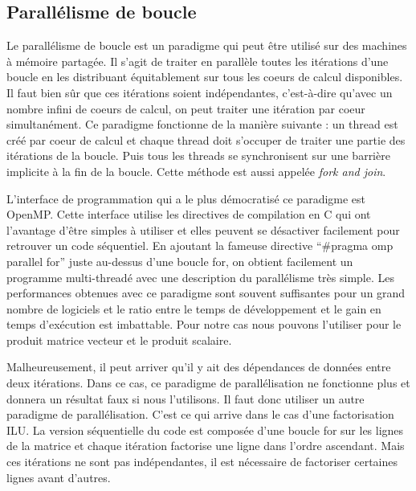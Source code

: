 \subsection{Parallélisme de boucle}
Le parallélisme de boucle est un paradigme qui peut être utilisé sur des machines à mémoire partagée.
%
Il s'agit de traiter en parallèle toutes les itérations d'une boucle en les distribuant équitablement sur tous les coeurs de calcul disponibles.
%
Il faut bien sûr que ces itérations soient indépendantes, c'est-à-dire qu'avec un nombre infini de coeurs de calcul, on peut traiter une itération par coeur simultanément.
%
Ce paradigme fonctionne de la manière suivante : un thread est créé par coeur de calcul et chaque thread doit s'occuper de traiter une partie des itérations de la boucle.
%
Puis tous les threads se synchronisent sur une barrière implicite à la fin de la boucle.
%
Cette méthode est aussi appelée {\em fork and join}.

L'interface de programmation qui a le plus démocratisé ce paradigme est OpenMP.
%
Cette interface utilise les directives de compilation en C qui ont l'avantage d'être simples à utiliser et elles peuvent se désactiver facilement pour retrouver un code séquentiel.
%
En ajoutant la fameuse directive ``\#pragma omp parallel for'' juste au-dessus d'une boucle for, on obtient facilement un programme multi-threadé avec une description du parallélisme très simple.
%
Les performances obtenues avec ce paradigme sont souvent suffisantes pour un grand nombre de logiciels et le ratio entre le temps de développement et le gain en temps d'exécution est imbattable.
%
Pour notre cas nous pouvons l'utiliser pour le produit matrice vecteur et le produit scalaire.

Malheureusement, il peut arriver qu'il y ait des dépendances de données entre deux itérations.
%
Dans ce cas, ce paradigme de parallélisation ne fonctionne plus et donnera un résultat faux si nous l'utilisons.
%
Il faut donc utiliser un autre paradigme de parallélisation.
%
C'est ce qui arrive dans le cas d'une factorisation ILU.
%
La version séquentielle du code est composée d'une boucle for sur les lignes de la matrice et chaque itération factorise une ligne dans l'ordre ascendant.
%
Mais ces itérations ne sont pas indépendantes, il est nécessaire de factoriser certaines lignes avant d'autres.
